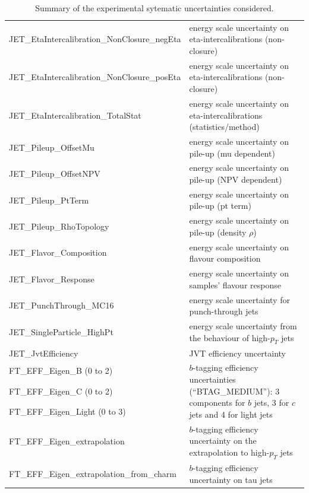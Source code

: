 \begin{table}
{\begin{tabular}{l|l}
  JET\_EtaIntercalibration\_NonClosure\_negEta &  energy scale uncertainty on eta-intercalibrations (non-closure) \\
  JET\_EtaIntercalibration\_NonClosure\_posEta & energy scale uncertainty on eta-intercalibrations (non-closure) \\
  JET\_EtaIntercalibration\_TotalStat & energy scale uncertainty on eta-intercalibrations (statistics/method) \\
  JET\_Pileup\_OffsetMu                & energy scale uncertainty on pile-up (mu dependent)    \\
  JET\_Pileup\_OffsetNPV               & energy scale uncertainty on pile-up (NPV dependent)   \\
  JET\_Pileup\_PtTerm                  & energy scale uncertainty on pile-up (pt term)         \\
  JET\_Pileup\_RhoTopology             & energy scale uncertainty on pile-up (density $\rho$)  \\
  JET\_Flavor\_Composition             & energy scale uncertainty on flavour composition       \\
  JET\_Flavor\_Response                & energy scale uncertainty on samples' flavour response \\
  JET\_PunchThrough\_MC16              & energy scale uncertainty for punch-through jets       \\
  JET\_SingleParticle\_HighPt          & energy scale uncertainty from the behaviour of high-$p_T$ jets \\
  JET\_JvtEfficiency & JVT efficiency uncertainty      \\
  FT\_EFF\_Eigen\_B (0 to 2) & \multirow{3}{*}{\parbox{11cm}{$b$-tagging efficiency uncertainties (``BTAG\_MEDIUM''): 3 components for $b$ jets, 3 for $c$ jets and 4 for light jets}} \\
  FT\_EFF\_Eigen\_C (0 to 2)                 & \\
  FT\_EFF\_Eigen\_Light (0 to 3)             & \\
  FT\_EFF\_Eigen\_extrapolation              & $b$-tagging efficiency uncertainty on the extrapolation to high-$p_T$ jets\\
  FT\_EFF\_Eigen\_extrapolation\_from\_charm & $b$-tagging efficiency uncertainty on tau jets \\
\hline\hline     
\end{tabular}
}
\caption{Summary of the experimental sytematic uncertainties considered.}
\label{tab:expSyst}
\end{table}

